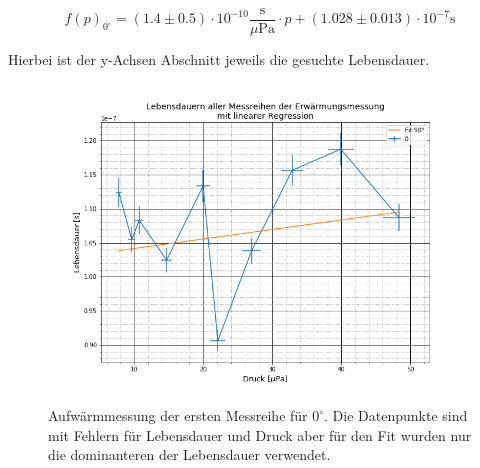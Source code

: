 \begin{equation*}
f(p)_{0^\circ}=(1.4\pm 0.5)\cdot 10^{-10} \frac{\text{s}}{\text{$\mu$Pa}}\cdot p + (1.028\pm 0.013)\cdot 10^{-7} \text{s}
\end{equation*}

Hierbei ist der y-Achsen Abschnitt jeweils die gesuchte Lebensdauer.
\begin{figure}[ht]
	\includegraphics[scale=0.5]{Bild/Auf}
	\centering
	\caption[Druck zu Lebensdauer Fit für Aufwärmung]{Aufwärmmessung der ersten Messreihe für $0^\circ$. Die Datenpunkte sind mit Fehlern für Lebensdauer und Druck aber für den Fit wurden nur die dominanteren der Lebensdauer verwendet.}
	\label{Auf1}
\end{figure}
\FloatBarrier
